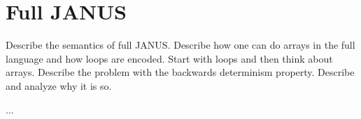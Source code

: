 \chapter{Full JANUS}


Describe the semantics of full JANUS. Describe how one can do arrays
in the full language and how loops are encoded. Start with loops and
then think about arrays. Describe the problem with the backwards
determinism property. Describe and analyze why it is so.

...


